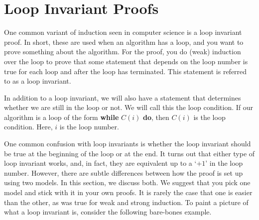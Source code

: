 \documentclass{article}
\theoremstyle{plain}
\theoremstyle{definition}
\begin{document}
\section{Loop Invariant Proofs}\label{sec_loop_inv}

One common variant of induction seen in computer science is a loop invariant proof. In short, these are used when an algorithm has a loop, and you want to prove something about the algorithm. For the proof, you do (weak) induction over the loop to prove that some statement that depends on the loop number is true for each loop and after the loop has terminated. This statement is referred to as a loop invariant.

In addition to a loop invariant, we will also have a statement that determines whether we are still in the loop or not. We will call this the loop condition. If our algorithm is a loop of the form \textbf{while} \(C(i)\) \textbf{do}, then \(C(i)\) is the loop condition. Here, \(i\) is the loop number.

One common confusion with loop invariants is whether the loop invariant should be true at the beginning of the loop or at the end. It turns out that either type of loop invariant works, and, in fact, they are equivalent up to a `\(+1\)' in the loop number. However, there are subtle differences between how the proof is set up using two models. In this section, we discuss both. We suggest that you pick one model and stick with it in your own proofs. It is rarely the case that one is easier than the other, as was true for weak and strong induction. To paint a picture of what a loop invariant is, consider the following bare-bones example.
\end{document}
